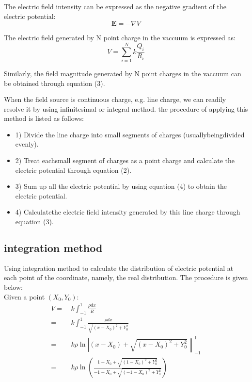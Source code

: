 \documentclass[10pt, journal, final]{IEEEtran}
\begin{document}
The electric field intensity can be expressed as the negative gradient of
the electric potential:
\begin{equation}
    \mathbf{E} = -\nabla V
\end{equation}

The electric field generated by N point charge in the vaccuum is expressed as:
\begin{equation}
    V = \sum_{i=1}^N k\frac{Q_i}{R_i}
\end{equation}

Similarly, the field magnitude generated by N point charges in the vaccuum can
be obtained through equation (3).\par

When the field source is continuous charge, e.g. line charge, we can readily resolve it
by using infinitesimal or integral method. the procedure of applying this method is
listed as follows:
\begin{itemize}
    \item 1) Divide the line charge into small segments of charges
          (usuallybeingdivided evenly).
    \item 2) Treat eachsmall segment of charges as a point charge and
          calculate the electric potential through equation (2).
    \item 3) Sum  up  all  the  electric  potential by using  equation  (4)
          to  obtain  the  electric potential.
    \item 4) Calculatethe electric field intensity generated by
          this line charge through equation (3).
\end{itemize}

\subsection{
    integration method
}\label{
    method:integration
}
Using integration method to calculate the distribution of electric potential
at each point of the coordinate, namely, the real distribution.
The procedure is given below:\\
Given a point $(X_0, Y_0)$:
\begin{equation}
    \begin{aligned}
        V= & \  k\int_{-1}^{1} \frac{\rho dx}{R}                                     \\
        =  & \ k\int_{-1}^{1} \frac{\rho dx}{\sqrt{(x-X_0)^2+Y_0^2}}                 \\
        =  & \ k \rho \ln{\left | (x-X_0)+\sqrt{(x-X_0)^2+Y_0^2} \right \|_{-1}^1  } \\
        =  & \  k \rho \ln{\left(
            \frac{1-X_0+\sqrt{(1-X_0)^2+Y_0^2}}{-1-X_0+\sqrt{(-1-X_0)^2+Y_0^2}}
            \right)}                                                                 \\
    \end{aligned}
\end{equation}
\end{document}
